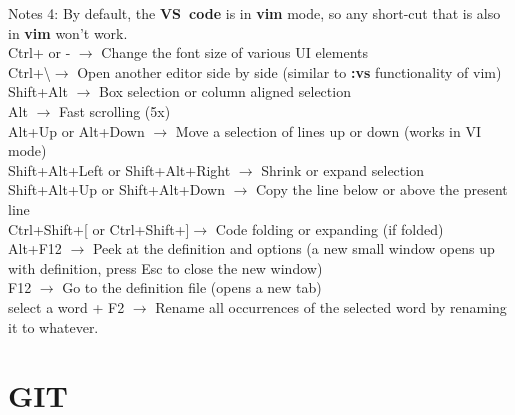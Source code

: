 \documentclass[twoside,a4paper]{article}
\newcommand{\tcb}{\color{blue}}
\newcommand{\tcc}{\color{cyan}}
\newcommand{\tcg}{\color{gray}}
\newcommand{\tck}{\color{black}}
\newcommand{\ra }{$\rightarrow$ }
\newcommand{\hs}{\hspace}
\begin{document}
\begin{multicols}{2}
    \hs{-0.5cm}\tcg  Notes 4: By default, the \textbf{VS~code} 
    is in \textbf{vim} mode, so any short-cut that is also in \textbf{vim} 
    won't work.\\
    \hs{-0.5cm} \tcb  Ctrl+ or - \tck \ra 
    Change the font size of various UI elements\\
    \hs{-0.5cm} \tcb  Ctrl+\textbackslash \tck  \ra Open
     another editor side by side (similar to \textbf{:vs} functionality 
     of vim)\\
    \hs{-0.5cm} \tcb Shift+Alt \tck \ra Box selection or column aligned 
    selection\\
    \hs{-0.5cm} \tcb Alt \tck \ra Fast scrolling (5x)\\
    \hs{-0.5cm} \tcb Alt+Up or Alt+Down \tck \ra Move a selection of 
    lines up or down (works in VI mode)\\
    \hs{-0.5cm} \tcb Shift+Alt+Left or Shift+Alt+Right \tck \ra Shrink 
    or expand selection\\
    \hs{-0.5cm} \tcb Shift+Alt+Up or Shift+Alt+Down \tck \ra Copy the 
    line below or above the present line\\
    \hs{-0.5cm} \tcb Ctrl+Shift+[ or Ctrl+Shift+]\tck \ra Code folding
     or expanding (if folded)\\
    \hs{-0.5cm} \tcb Alt+F12 \tck \ra Peek at the definition and 
     options (a new small window opens up with definition, press
      Esc to close the new window)\\
    \hs{-0.5cm} \tcb F12 \tck \ra Go to the definition file (opens 
    a new tab)\\
    \hs{-0.5cm} \tcb select a word + F2 \tck \ra Rename all occurrences 
    of the selected word by renaming it to whatever.

\tcc \section{GIT}


\end{multicols}
\end{document}
